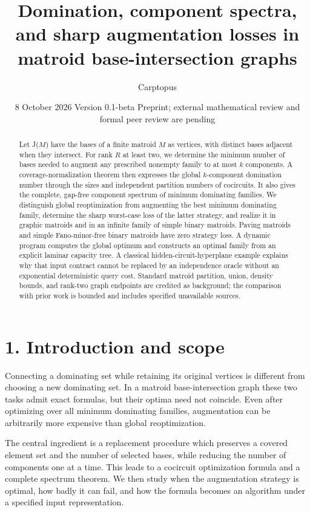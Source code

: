 \documentclass[11pt]{article}
\title{Domination, component spectra, and sharp augmentation losses in matroid base-intersection graphs}
\author{Carptopus}
\date{8 October 2026 \textperiodcentered{} Version 0.1-beta \textperiodcentered{} Preprint; external mathematical review and formal peer review are pending}
\begin{document}
\maketitle

\begin{abstract}

Let J(\(M\)) have the bases of a finite matroid \(M\) as vertices, with distinct bases adjacent when they intersect. For rank \(R\) at least two, we determine the minimum number of bases needed to augment any prescribed nonempty family to at most \(k\) components. A coverage-normalization theorem then expresses the global \(k\)-component domination number through the sizes and independent partition numbers of cocircuits. It also gives the complete, gap-free component spectrum of minimum dominating families. We distinguish global reoptimization from augmenting the best minimum dominating family, determine the sharp worst-case loss of the latter strategy, and realize it in graphic matroids and in an infinite family of simple binary matroids. Paving matroids and simple Fano-minor-free binary matroids have zero strategy loss. A dynamic program computes the global optimum and constructs an optimal family from an explicit laminar capacity tree. A classical hidden-circuit-hyperplane example explains why that input contract cannot be replaced by an independence oracle without an exponential deterministic query cost. Standard matroid partition, union, density bounds, and rank-two graph endpoints are credited as background; the comparison with prior work is bounded and includes specified unavailable sources.

\end{abstract}
\section*{1. Introduction and scope}

Connecting a dominating set while retaining its original vertices is different from choosing a new dominating set. In a matroid base-intersection graph these two tasks admit exact formulas, but their optima need not coincide. Even after optimizing over all minimum dominating families, augmentation can be arbitrarily more expensive than global reoptimization.

The central ingredient is a replacement procedure which preserves a covered element set and the number of selected bases, while reducing the number of components one at a time. This leads to a cocircuit optimization formula and a complete spectrum theorem. We then study when the augmentation strategy is optimal, how badly it can fail, and how the formula becomes an algorithm under a specified input representation.
\end{document}
